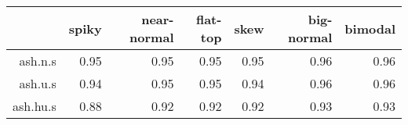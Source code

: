\begin{tabular}{rrrrrrr}
  \toprule  & spiky & near-normal & flat-top & skew & big-normal & bimodal \\ 
  \midrule ash.n.s & 0.95 & 0.95 & 0.95 & 0.95 & 0.96 & 0.96 \\ 
  ash.u.s & 0.94 & 0.95 & 0.95 & 0.94 & 0.96 & 0.96 \\ 
  ash.hu.s & 0.88 & 0.92 & 0.92 & 0.92 & 0.93 & 0.93 \\ 
   \bottomrule \end{tabular}

